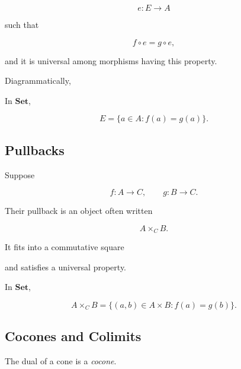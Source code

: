 \[ e:E\to A \]

such that

\[ f\circ e=g\circ e, \]

and it is universal among morphisms having this property.

Diagrammatically,

\begin{center}
\end{center}

In \(\mathbf{Set}\),

\[ E=\{a\in A:f(a)=g(a)\}. \]

\subsection{Pullbacks}
\label{subsec:pullbacks}

Suppose

\[ f:A\to C,\qquad g:B\to C. \]

Their pullback is an object often written

\[ A\times_C B. \]

It fits into a commutative square

\begin{center}
\end{center}

and satisfies a universal property.

In \(\mathbf{Set}\),

\[ A\times_C B=\{(a,b)\in A\times B:f(a)=g(b)\}. \]

\subsection{Cocones and Colimits}
\label{subsec:cocones-colimits}

The dual of a cone is a \emph{cocone}.

